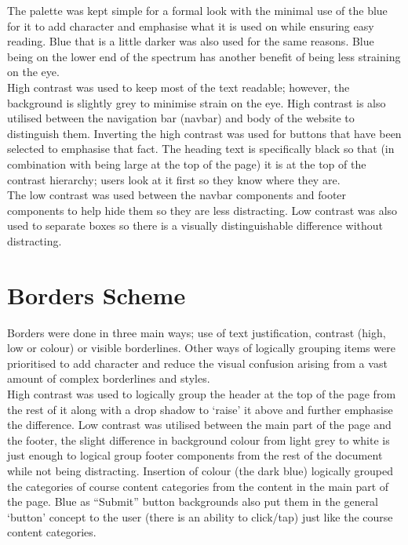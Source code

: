 \documentclass[10pt,a4paper]{article}
\begin{document}
	The palette was kept simple for a formal look with the minimal use of the blue for it to add character and emphasise what it is used on while ensuring easy reading. Blue that is a little darker was also used for the same reasons. Blue being on the lower end of the spectrum has another benefit of being less straining on the eye.\\
	
	High contrast was used to keep most of the text readable; however, the background is slightly grey to minimise strain on the eye. High contrast is also utilised between the navigation bar (navbar) and body of the website to distinguish them. Inverting the high contrast was used for buttons that have been selected to emphasise that fact.  The heading text is specifically black so that (in combination with being large at the top of the page) it is at the top of the contrast hierarchy; users look at it first so they know where they are.\\	
	
	The low contrast was used between the navbar components and footer components to help hide them so they are less distracting. Low contrast was also used to separate boxes so there is a visually distinguishable difference without distracting.
	
	
\section{Borders Scheme}
	Borders were done in three main ways; use of text justification, contrast (high, low or colour) or visible borderlines. Other ways of logically grouping items were prioritised to add character and reduce the visual confusion arising from a vast amount of complex borderlines and styles.\\
	
	High contrast was used to logically group the header at the top of the page from the rest of it along with a drop shadow  to `raise' it above and further emphasise the difference. Low contrast was utilised between the main part of the page and the footer, the slight difference in background colour from light grey to white is just enough to logical group footer components from the rest of the document while not being distracting. Insertion of colour (the dark blue) logically grouped the categories of course content categories from the content in the main part of the page. Blue as ``Submit'' button backgrounds also put them in the general `button' concept to the user (there is an ability to click/tap) just like the course content categories.\\
	
\end{document}
